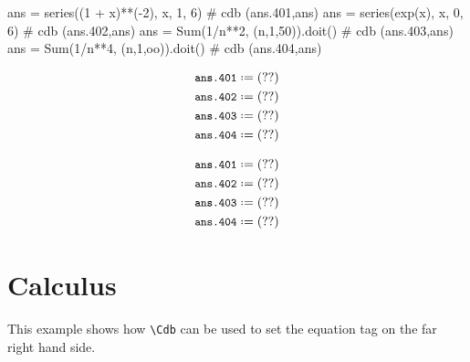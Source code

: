 \documentclass[12pt]{cdblatex}
\begin{document}
\vspace{-10pt}

\begin{minipage}[t]{0.65\textwidth}
\begin{cadabra}
   ans = series((1 + x)**(-2), x, 1, 6)         # cdb (ans.401,ans)
   ans = series(exp(x), x, 0, 6)                # cdb (ans.402,ans)
   ans = Sum(1/n**2, (n,1,50)).doit()           # cdb (ans.403,ans)
   ans = Sum(1/n**4, (n,1,oo)).doit()           # cdb (ans.404,ans)
\end{cadabra}
\end{minipage}
\hskip 1cm
\begin{minipage}[t]{0.35\textwidth}
\begin{latex}
   \begin{align*}
      &\cdb*{ans.401}\\
      &\cdb*{ans.402}\\
      &\cdb*{ans.403}\\
      &\cdb*{ans.404}
   \end{align*}
\end{latex}
\end{minipage}

\begin{align*}
   &\cdb*{ans.401}\\
   &\cdb*{ans.402}\\
   &\cdb*{ans.403}\\
   &\cdb*{ans.404}
\end{align*}

\clearpage

\section*{Calculus}

This example shows how {\tt\small\verb|\Cdb|} can be used to set the equation tag on the far right hand side.
\end{document}
